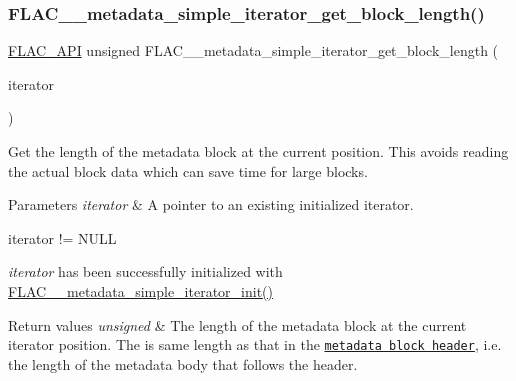 \subsubsection{\texorpdfstring{F\+L\+A\+C\+\_\+\+\_\+metadata\+\_\+simple\+\_\+iterator\+\_\+get\+\_\+block\+\_\+length()}{FLAC\_\_metadata\_simple\_iterator\_get\_block\_length()}}
{\footnotesize\ttfamily \hyperlink{group__flac__export_ga56ca07df8a23310707732b1c0007d6f5}{F\+L\+A\+C\+\_\+\+A\+PI} unsigned F\+L\+A\+C\+\_\+\+\_\+metadata\+\_\+simple\+\_\+iterator\+\_\+get\+\_\+block\+\_\+length (\begin{DoxyParamCaption}\item[{\hyperlink{zconf_8h_a2c212835823e3c54a8ab6d95c652660e}{const} \hyperlink{group__flac__metadata__level1_ga6accccddbb867dfc2eece9ee3ffecb3a}{F\+L\+A\+C\+\_\+\+\_\+\+Metadata\+\_\+\+Simple\+Iterator} $\ast$}]{iterator }\end{DoxyParamCaption})}

Get the length of the metadata block at the current position. This avoids reading the actual block data which can save time for large blocks.


\begin{DoxyParams}{Parameters}
{\em iterator} & A pointer to an existing initialized iterator.  
\begin{DoxyCode}
iterator != NULL 
\end{DoxyCode}
 {\itshape iterator} has been successfully initialized with \hyperlink{group__flac__metadata__level1_ga2a055cca4e6e06ae62517c8b0fa6e8a3}{F\+L\+A\+C\+\_\+\+\_\+metadata\+\_\+simple\+\_\+iterator\+\_\+init()} \\
\hline
\end{DoxyParams}

\begin{DoxyRetVals}{Return values}
{\em unsigned} & The length of the metadata block at the current iterator position. The is same length as that in the \href{http://xiph.org/flac/format.html#metadata_block_header}{\tt metadata block header}, i.\+e. the length of the metadata body that follows the header. \\
\hline
\end{DoxyRetVals}
\mbox{\label{group__flac__metadata__level1_ga46e158a3f70c0e39db9c68a9ff9a2621}} 
